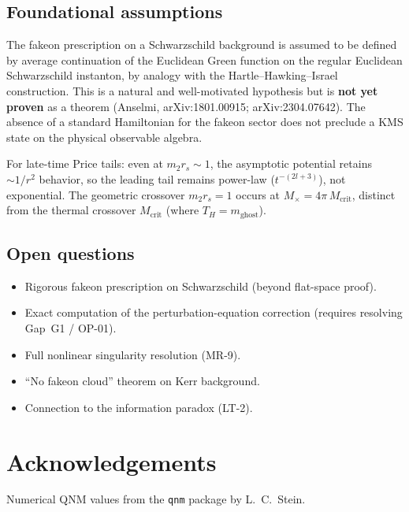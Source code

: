 \documentclass[11pt,a4paper]{article}
\newcommand{\Mcrit}{M_{\mathrm{crit}}}
\begin{document}
\subsection*{Foundational assumptions}

The fakeon prescription on a Schwarzschild background is assumed to be
defined by average continuation of the Euclidean Green function on the
regular Euclidean Schwarzschild instanton, by analogy with the
Hartle--Hawking--Israel construction. This is a natural and well-motivated
hypothesis but is \textbf{not yet proven} as a theorem
(Anselmi, arXiv:1801.00915; arXiv:2304.07642).
The absence of a standard Hamiltonian for the fakeon sector
does not preclude a KMS state on the physical observable algebra.

For late-time Price tails: even at $m_2 r_s \sim 1$, the asymptotic
potential retains $\sim 1/r^2$ behavior, so the leading tail remains
power-law ($t^{-(2l+3)}$), not exponential. The geometric crossover
$m_2 r_s = 1$ occurs at $M_\times = 4\pi\,\Mcrit$, distinct from
the thermal crossover $\Mcrit$ (where $T_H = m_{\mathrm{ghost}}$).

\subsection*{Open questions}
\begin{itemize}
\item Rigorous fakeon prescription on Schwarzschild (beyond flat-space proof).
\item Exact computation of the perturbation-equation correction
(requires resolving Gap~G1 / OP-01).
\item Full nonlinear singularity resolution (MR-9).
\item ``No fakeon cloud'' theorem on Kerr background.
\item Connection to the information paradox (LT-2).
\end{itemize}

\section*{Acknowledgements}

Numerical QNM values from the \texttt{qnm} package by L.~C.~Stein.



\end{document}
